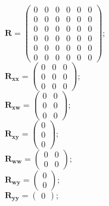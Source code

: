 \documentclass[11pt, oneside]{article}      %
\begin{document}
%
$ \mathbf{R} = \left(\begin{array}{cccccc}0 & 0 & 0 & 0 & 0 & 0\\0 & 0 & 0 & 0 & 0 & 0\\0 & 0 & 0 & 0 & 0 & 0\\0 & 0 & 0 & 0 & 0 & 0\\0 & 0 & 0 & 0 & 0 & 0\\0 & 0 & 0 & 0 & 0 & 0\end{array}\right) ; $ 
%
\\
%
$ \mathbf{R_{xx}} = \left(\begin{array}{ccc}0 & 0 & 0\\0 & 0 & 0\\0 & 0 & 0\end{array}\right) ; $ 
%
\\
%
$ \mathbf{R_{xw}} = \left(\begin{array}{cc}0 & 0\\0 & 0\\0 & 0\end{array}\right) ; $ 
%
\\
%
$ \mathbf{R_{xy}} = \left(\begin{array}{c}0\\0\\0\end{array}\right) ; $ 
%
\\
%
$ \mathbf{R_{ww}} = \left(\begin{array}{cc}0 & 0\\0 & 0\end{array}\right) ; $ 
%
\\
%
$ \mathbf{R_{wy}} = \left(\begin{array}{c}0\\0\end{array}\right) ; $ 
%
\\
%
$ \mathbf{R_{yy}} = \left(\begin{array}{c}0\end{array}\right) ; $ 
%
\\
%
\end{document}
